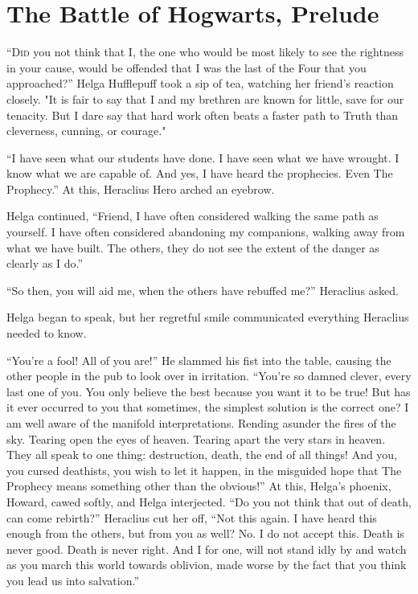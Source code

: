 \chapter{The Battle of Hogwarts, Prelude}


\simpleline


\lettrine{“D}{id} you not think that I, the one who would be most likely to see the rightness in your cause, would be offended that I was the last of the Four that you approached?” Helga Hufflepuff took a sip of tea, watching her friend’s reaction closely. "It is fair to say that I and my brethren are known for little, save for our tenacity. But I dare say that hard work often beats a faster path to Truth than cleverness, cunning, or courage."
\pagebreak

“I have seen what our students have done. I have seen what we have wrought. I know what we are capable of. And yes, I have heard the prophecies. Even The Prophecy.” At this, Heraclius Hero arched an eyebrow.

Helga continued, “Friend, I have often considered walking the same path as yourself. I have often considered abandoning my companions, walking away from what we have built. The others, they do not see the extent of the danger as clearly as I do.”

“So then, you will aid me, when the others have rebuffed me?” Heraclius asked.

Helga began to speak, but her regretful smile communicated everything Heraclius needed to know.

“You’re a fool! All of you are!” He slammed his fist into the table, causing the other people in the pub to look over in irritation. “You’re so damned clever, every last one of you. You only believe the best because you want it to be true! But has it ever occurred to you that sometimes, the simplest solution is the correct one? I am well aware of the manifold interpretations. Rending asunder the fires of the sky. Tearing open the eyes of heaven. Tearing apart the very stars in heaven. They all speak to one thing: destruction, death, the end of all things! And you, you cursed deathists, you wish to let it happen, in the misguided hope that The Prophecy means something other than the obvious!”
\SmallVSpace
At this, Helga’s phoenix, Howard, cawed softly, and Helga interjected. “Do you not think that out of death, can come rebirth?” Heraclius cut her off, “Not this again. I have heard this enough from the others, but from you as well? No. I do not accept this. Death is never good. Death is never right. And I for one, will not stand idly by and watch as you march this world towards oblivion, made worse by the fact that you think you lead us into salvation.”

